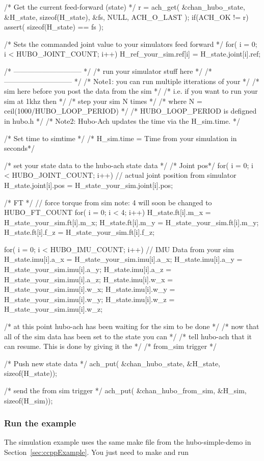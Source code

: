 \begin{code}
{{        /* Get the current feed-forward (state) */
        r = ach_get( &chan_hubo_state, &H_state, sizeof(H_state), &fs, NULL, ACH_O_LAST );
        if(ACH_OK != r) {
            assert( sizeof(H_state) == fs );
        }
        
        /* Sets the commanded joint value to your simulators feed forward */
        for( i = 0; i < HUBO_JOINT_COUNT; i++){
	    H_ref_your_sim.ref[i] = H_state.joint[i].ref;		
        }

       /* ----------------------------- */
       /* run your simulator stuff here */
       /* ----------------------------- */
       /* Note1: you can run multiple itterations of your      */
       /*       sim here before you post the data from the sim */
       /*       i.e. if you want to run your sim at 1khz then  */
       /*       step your sim N times                          */
       /*       where N = ceil(1000/HUBO_LOOP_PERIOD)   */
       /*       HUBO_LOOP_PERIOD is defigned in hubo.h  */
       /* Note2: Hubo-Ach updates the time via the H_sim.time. */

       /* Set time to simtime */
       /* H_sim.time = Time from your simulation in seconds*/

        /* set your state data to the hubo-ach state data */
        /* Joint pos*/
        for( i = 0; i < HUBO_JOINT_COUNT; i++){
            // actual joint position from simulator
            H_state.joint[i].pos = H_state_your_sim.joint[i].pos;  
        }

        /* FT */
        // force torque from sim  note: 4 will soon be changed to HUBO_FT_COUNT
        for( i = 0; i < 4; i++){        
            H_state.ft[i].m_x = H_state_your_sim.ft[i].m_x;
            H_state.ft[i].m_y = H_state_your_sim.ft[i].m_y;
            H_state.ft[i].f_z = H_state_your_sim.ft[i].f_z;
        }

        for( i = 0; i < HUBO_IMU_COUNT; i++){        // IMU Data from your sim
            H_state.imu[i].a_x = H_state_your_sim.imu[i].a_x;
            H_state.imu[i].a_y = H_state_your_sim.imu[i].a_y;
            H_state.imu[i].a_z = H_state_your_sim.imu[i].a_z;
            H_state.imu[i].w_x = H_state_your_sim.imu[i].w_x;
            H_state.imu[i].w_y = H_state_your_sim.imu[i].w_y;
            H_state.imu[i].w_z = H_state_your_sim.imu[i].w_z;
       }

       /* at this point hubo-ach has been waiting for the sim to be done */
       /* now that all of the sim data has been set to the state you can */
       /* tell hubo-ach that it can resume.  This is done by giving it the */
       /* from_sim trigger */

       /* Push new state data */
       ach_put( &chan_hubo_state, &H_state, sizeof(H_state));

       /* send the from sim trigger */
       ach_put( &chan_hubo_from_sim, &H_sim, sizeof(H_sim));
    }
}
\end{code}
\normalsize

\subsubsection{Run the example}
The simulation example uses the same make file from the hubo-simple-demo in Section~\ref{sec:ccppExample}. You just need to make and run

